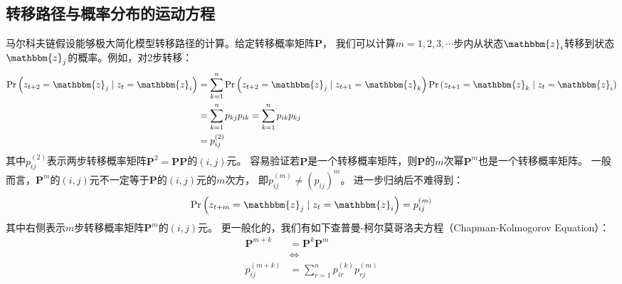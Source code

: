 \subsection{转移路径与概率分布的运动方程}

马尔科夫链假设能够极大简化模型转移路径的计算。给定转移概率矩阵$\boldsymbol{P}$，
我们可以计算$m=1,2,3,\cdots$步内从状态$\mathbbm{z}_i$转移到状态$\mathbbm{z}_j$的概率。例如，对2步转移：
\begin{equation*}
    \begin{aligned}
        \operatorname{Pr}\left(z_{t+2}=\mathbbm{z}_j \mid z_t=\mathbbm{z}_i\right) 
            &= \sum_{k=1}^n \operatorname{Pr}\left(z_{t+2}=\mathbbm{z}_j \mid z_{t+1}=\mathbbm{z}_k\right) 
                    \operatorname{Pr}\left(z_{t+1}=\mathbbm{z}_k \mid z_t=\mathbbm{z}_i\right) \\
            &= \sum_{k=1}^n p_{k j} p_{i k} = \sum_{k=1}^n p_{i k} p_{k j} \\
            &= p^{\left(2\right)}_{i j} 
    \end{aligned}
\end{equation*}
其中$p^{\left(2\right)}_{i j}$表示两步转移概率矩阵$\boldsymbol{P}^2=\boldsymbol{P}\boldsymbol{P}$的$(i,j)$元。
容易验证若$\boldsymbol{P}$是一个转移概率矩阵，则$\boldsymbol{P}$的$m$次幂$\boldsymbol{P}^{m}$也是一个转移概率矩阵。
一般而言，$\boldsymbol{P}^{m}$的$(i,j)$元不一定等于$\boldsymbol{P}$的$(i,j)$元的$m$次方，
即$p^{\left(m\right)}_{i j}\neq \left(p_{i j}\right)^m$。
进一步归纳后不难得到：
\begin{equation}
    \operatorname{Pr}\left(z_{t+m}= \mathbbm{z}_j\mid z_t=\mathbbm{z}_i\right) = p^{\left(m\right)}_{i j}
\end{equation}
其中右侧表示$m$步转移概率矩阵$\boldsymbol{P}^m$的$(i,j)$元。
更一般化的，我们有如下查普曼-柯尔莫哥洛夫方程（Chapman-Kolmogorov Equation）：
\begin{equation}
    \begin{aligned}
        \boldsymbol{P}^{m+k} &= \boldsymbol{P}^k\boldsymbol{P}^m \\
        & \Leftrightarrow \\
        p^{(m+k)}_{i j} &= \sum_{r=1}^{n}p^{(k)}_{i r}p^{(m)}_{r j}
    \end{aligned}
\end{equation}

